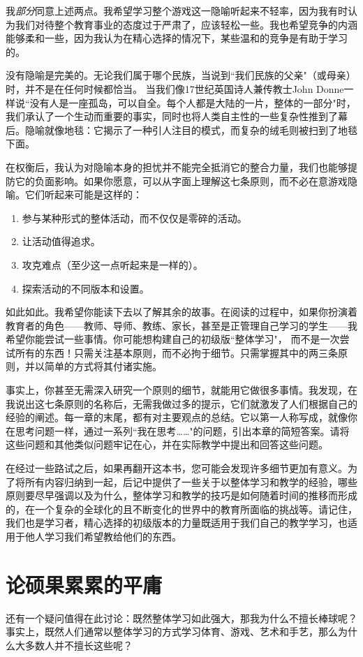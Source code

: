 我\textit{部分}同意上述两点。我希望学习整个游戏这一隐喻听起来不轻率，因为我有时认为我们对待整个教育事业的态度过于严肃了，应该轻松一些。我也希望竞争的内涵能够柔和一些，因为我认为在精心选择的情况下，某些温和的竞争是有助于学习的。

没有隐喻是完美的。无论我们属于哪个民族，当说到``我们民族的父亲"（或母亲）时，并不是在任何时候都恰当。
当我们像17世纪英国诗人兼传教士John Donne一样说``没有人是一座孤岛，可以自全。每个人都是大陆的一片，整体的一部分"时，
我们承认了一个生动而重要的事实，同时也将人类自主性的一些复杂性推到了幕后。隐喻就像地毯：它揭示了一种引人注目的模式，而复杂的绒毛则被扫到了地毯下面。

在权衡后，我认为对隐喻本身的担忧并不能完全抵消它的整合力量，我们也能够提防它的负面影响。如果你愿意，可以从字面上理解这七条原则，而不必在意游戏隐喻。它们听起来可能是这样的：
\begin{enumerate}
\item 参与某种形式的整体活动，而不仅仅是零碎的活动。
\item 让活动值得追求。
\item 攻克难点（至少这一点听起来是一样的）。
\item 探索活动的不同版本和设置。
\end{enumerate}

如此如此。我希望你能读下去以了解其余的故事。在阅读的过程中，如果你扮演着教育者的角色——教师、导师、教练、家长，甚至是正管理自己学习的学生——我希望你能尝试一些事情。你可能想构建自己的初级版``整体学习"，
而不是一次尝试所有的东西！只需关注基本原则，而不必拘于细节。只需掌握其中的两三条原则，并以简单的方式将其付诸实施。

事实上，你甚至无需深入研究一个原则的细节，就能用它做很多事情。我发现，在我说出这七条原则的名称后，无需我做过多的提示，它们就激发了人们根据自己的经验的阐述。每一章的末尾，都有对主要观点的总结。它以第一人称写成，就像你在思考问题一样，通过一系列``我在思考……"的问题，引出本章的简短答案。请将这些问题和其他类似问题牢记在心，并在实际教学中提出和回答这些问题。

在经过一些路试之后，如果再翻开这本书，您可能会发现许多细节更加有意义。为了将所有内容归纳到一起，后记中提供了一些关于以整体学习和教学的经验，哪些原则要尽早强调以及为什么，整体学习和教学的技巧是如何随着时间的推移而形成的，在一个复杂的全球化的且不断变化的世界中的教育所面临的挑战等。请记住，我们也是学习者，精心选择的初级版本的力量既适用于我们自己的教学学习，也适用于他人学习我们希望教给他们的东西。

\section*{论硕果累累的平庸}
还有一个疑问值得在此讨论：既然整体学习如此强大，那我为什么不擅长棒球呢？
事实上，既然人们通常以整体学习的方式学习体育、游戏、艺术和手艺，那么为什么大多数人并不擅长这些呢？

